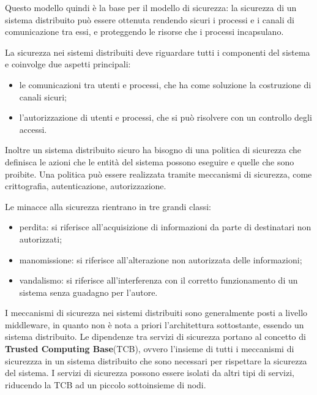 Questo modello quindi è la base per il modello di sicurezza: la sicurezza di un sistema distribuito può essere ottenuta rendendo sicuri i processi e i canali di comunicazione tra essi, e proteggendo le risorse che i processi incapsulano.

La sicurezza nei sistemi distribuiti deve riguardare tutti i componenti del sistema e coinvolge due aspetti principali:
\begin{itemize}
    \item le comunicazioni tra utenti e processi, che ha come soluzione la costruzione di canali sicuri;
    \item l'autorizzazione di utenti e processi, che si può risolvere con un controllo degli accessi.
\end{itemize}
Inoltre un sistema distribuito sicuro ha bisogno di una politica di sicurezza che definisca le azioni che le entità del sistema possono eseguire e quelle che sono proibite. Una politica può essere realizzata tramite meccanismi di sicurezza, come crittografia, autenticazione, autorizzazione.

Le minacce alla sicurezza rientrano in tre grandi classi:
\begin{itemize}
    \item perdita: si riferisce all'acquisizione di informazioni da parte di destinatari non autorizzati;
    \item manomissione: si riferisce all'alterazione non autorizzata delle informazioni;
    \item vandalismo: si riferisce all'interferenza con il corretto funzionamento di un sistema senza guadagno per l'autore.
\end{itemize}
I meccanismi di sicurezza nei sistemi distribuiti sono generalmente posti a livello middleware, in quanto non è nota a priori l'architettura sottostante, essendo un sistema distribuito.
Le dipendenze tra servizi di sicurezza portano al concetto di \textbf{Trusted Computing Base}(TCB), ovvero l'insieme di tutti i meccanismi di sicurezzza in un sistema distribuito che sono necessari per rispettare la sicurezza del sistema. I servizi di sicurezza possono essere isolati da altri tipi di servizi, riducendo la TCB ad un piccolo sottoinsieme di nodi.

